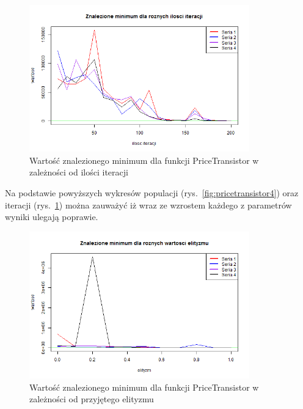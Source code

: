 \documentclass[11pt, a4paper]{article}
\newcommand{\fbi}{\leavevmode{\parindent=1em\indent}}
\begin{document}
\begin{figure}[H]
	\begin{center}
		\includegraphics[width=0.85\textwidth]{./assets/PriceTransistor5.png}
		\caption{Wartość znalezionego minimum dla funkcji PriceTransistor w zależności od ilości iteracji}
		\label{fig:pricetransistor5}
	\end{center}
\end{figure}

\fbi
Na podstawie powyższych wykresów populacji (rys.~\ref{fig:pricetransistor4}) oraz iteracji (rys.~\ref{fig:pricetransistor5}) można zauważyć iż wraz ze wzrostem każdego z parametrów wyniki ulegają poprawie.

\begin{figure}[H]
	\begin{center}
		\includegraphics[width=0.85\textwidth]{./assets/PriceTransistor6.png}
		\caption{Wartość znalezionego minimum dla funkcji PriceTransistor w zależności od przyjętego elityzmu}
		\label{fig:pricetransistor6}
	\end{center}
\end{figure}
\end{document}
